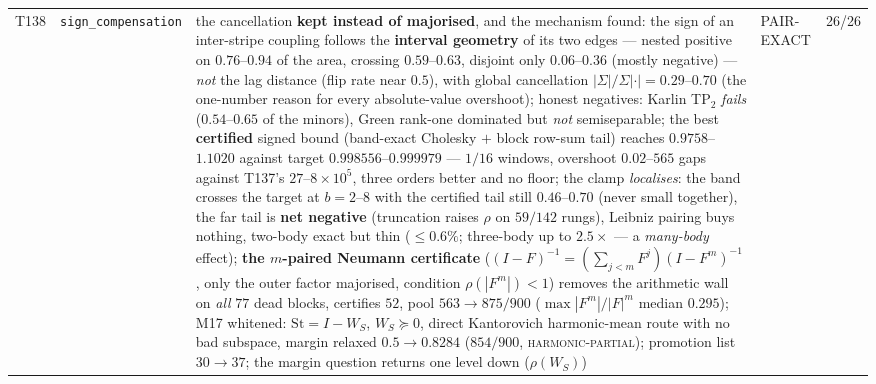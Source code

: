 \documentclass[11pt,a4paper]{article}
\begin{document}
{\begin{xltabular}{\linewidth}{@{}p{0.95cm} >{\raggedright\arraybackslash}p{3.1cm} Y >{\raggedright\scriptsize\arraybackslash}p{3.35cm} p{1.15cm}@{}}
T138 & \texttt{\scriptsize sign\_\allowbreak compensation} & the cancellation \textbf{kept instead of majorised}, and the mechanism found: the sign of an inter-stripe coupling follows the \textbf{interval geometry} of its two edges --- nested positive on $0.76$--$0.94$ of the area, crossing $0.59$--$0.63$, disjoint only $0.06$--$0.36$ (mostly negative) --- \emph{not} the lag distance (flip rate near $0.5$), with global cancellation $|\Sigma|/\Sigma|\cdot|=0.29$--$0.70$ (the one-number reason for every absolute-value overshoot); honest negatives: Karlin TP$_2$ \emph{fails} ($0.54$--$0.65$ of the minors), Green rank-one dominated but \emph{not} semiseparable; the best \textbf{certified} signed bound (band-exact Cholesky $+$ block row-sum tail) reaches $0.9758$--$1.1020$ against target $0.998556$--$0.999979$ --- $1/16$ windows, overshoot $0.02$--$565$ gaps against T137's $27$--$8\times10^{5}$, three orders better and no floor; the clamp \emph{localises}: the band crosses the target at $b=2$--$8$ with the certified tail still $0.46$--$0.70$ (never small together), the far tail is \textbf{net negative} (truncation raises $\rho$ on $59/142$ rungs), Leibniz pairing buys nothing, two-body exact but thin ($\le0.6\%$; three-body up to $2.5\times$ --- a \emph{many-body} effect); \textbf{the $m$-paired Neumann certificate} ($(I-F)^{-1}=(\sum_{j<m}F^j)(I-F^m)^{-1}$, only the outer factor majorised, condition $\rho(|F^m|)<1$) removes the arithmetic wall on \emph{all} $77$ dead blocks, certifies $52$, pool $563\to875/900$ ($\max|F^m|/|F|^m$ median $0.295$); M17 whitened: $\mathrm{St}=I-W_S$, $W_S\succeq0$, direct Kantorovich harmonic-mean route with no bad subspace, margin relaxed $0.5\to0.8284$ ($854/900$, \textsc{harmonic-partial}); promotion list $30\to37$; the margin question returns one level down ($\rho(W_S)$) & PAIR-EXACT & 26/26\\

\end{xltabular}}
\end{document}
